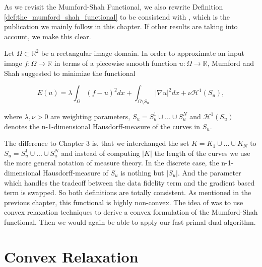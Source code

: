 As we revisit the Mumford-Shah Functional, we also rewrite Definition \ref{def:the_mumford_shah_functional} to be consistend with \cite{Pock-et-al-iccv09}, which is the publication we mainly follow in this chapter. If other results are taking into account, we make this clear.

\begin{definition} %
\label{def:the_mumford_shah_functional_revisited}

    Let $\Omega \subset \mathbb{R}^{2}$ be a rectangular image domain. In order to approximate an input image $f: \Omega \longrightarrow \mathbb{R}$ in terms of a piecewise smooth function $u: \Omega \longrightarrow \mathbb{R}$, Mumford and Shah suggested to minimize the functional
        
        \begin{equation}
            E(u) = \lambda \int_{\Omega} (f - u)^{2} dx + \int_{\Omega \setminus S_{u}} |\nabla u|^{2} dx + \nu \mathcal{H}^{1}(S_{u}),
        \end{equation}
        \label{eq:the_mumford_shah_functional_revisited}
    
    where $\lambda, \nu > 0$ are weighting parameters, $S_{u} = S^{1}_{u} \cup ... \cup S^{N}_{u}$ and $\mathcal{H}^{1}(S_{u})$ denotes the n-1-dimensional Hausdorff-measure of the curves in $S_{u}$.

\end{definition}

The difference to Chapter 3 is, that we interchanged the set $K = K_{1} \cup ... \cup K_{N}$ to $S_{u} = S^{1}_{u} \cup ... \cup S^{N}_{u}$ and instead of computing $|K|$ the length of the curves we use the more general notation of measure theory. In the discrete case, the n-1-dimensional Hausdorff-measure of $S_{u}$ is nothing but $|S_{u}|$. And the parameter which handles the tradeoff between the data fidelity term and the gradient based term is swapped. So both definitions are totally consistent. As mentioned in the previous chapter, this functional is highly non-convex. The idea of \cite{Pock-et-al-iccv09} was to use convex relaxation techniques to derive a convex formulation of the Mumford-Shah functional. Then we would again be able to apply our fast primal-dual algorithm.

\section{Convex Relaxation} %
\label{sec:convex_relaxation}

